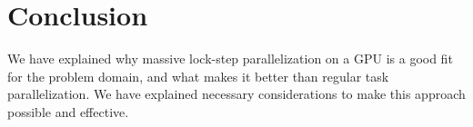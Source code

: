 \chapter{Conclusion}\label{sec:conclusion}

We have explained why massive lock-step parallelization on a GPU is a good fit for the problem domain, and what makes it better than regular task parallelization. We have explained necessary considerations to make this approach possible and effective.
